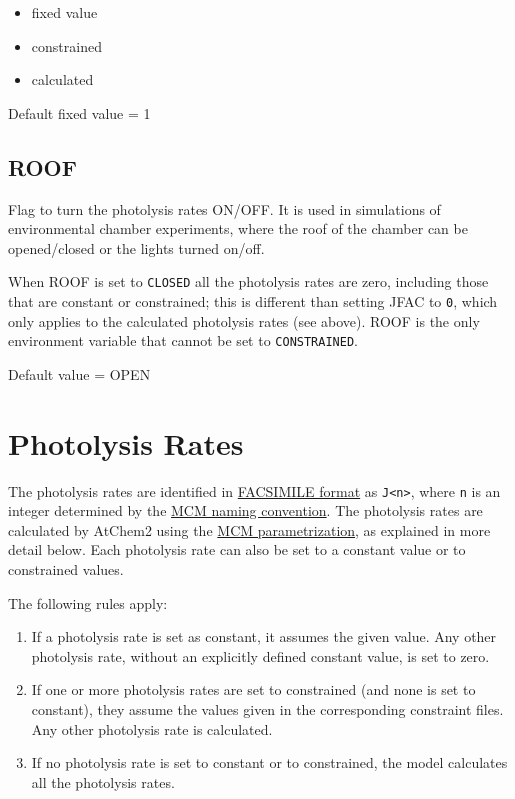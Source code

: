 \begin{itemize}
\item fixed value
\item constrained
\item calculated
\end{itemize}

Default fixed value = 1

\subsection{ROOF} \label{subsec:roof}

Flag to turn the photolysis rates ON/OFF. It is used in simulations of
environmental chamber experiments, where the roof of the chamber can
be opened/closed or the lights turned on/off.

When ROOF is set to \texttt{CLOSED} all the photolysis rates are zero,
including those that are constant or constrained; this is different
than setting JFAC to \texttt{0}, which only applies to the calculated
photolysis rates (see above). ROOF is the only environment variable
that cannot be set to \texttt{CONSTRAINED}.

Default value = OPEN

\section{Photolysis Rates} \label{sec:photolysis-rates}

The photolysis rates are identified in
\hyperref[sec:chemical-mechanism]{FACSIMILE format} as \verb|J<n>|,
where \texttt{n} is an integer determined by the
\href{http://mcm.leeds.ac.uk/MCM/parameters/photolysis.htt}{MCM naming
  convention}. The photolysis rates are calculated by AtChem2 using
the
\href{http://mcm.leeds.ac.uk/MCM/parameters/photolysis_param.htt}{MCM
  parametrization}, as explained in more detail below. Each photolysis
rate can also be set to a constant value or to constrained values.

The following rules apply:

\begin{enumerate}
\item If a photolysis rate is set as constant, it assumes the given
  value. Any other photolysis rate, without an explicitly defined
  constant value, is set to zero.
\item If one or more photolysis rates are set to constrained (and none
  is set to constant), they assume the values given in the
  corresponding constraint files. Any other photolysis rate is
  calculated.
\item If no photolysis rate is set to constant or to constrained, the
  model calculates all the photolysis rates.
\end{enumerate}

